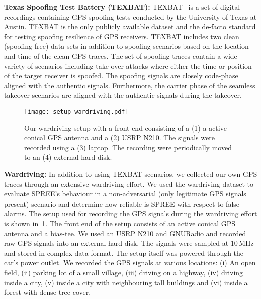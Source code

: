 \documentclass[letterpaper,twocolumn,10pt]{article}
\newcommand{\unit}[1]{\ensuremath{\, \mathrm{#1}}}
\newcommand{\rxname}{SPREE\xspace}
\begin{document}
\noindent\textbf{Texas Spoofing Test Battery (TEXBAT):} TEXBAT~\cite{humphreys2012texas} is a set of digital recordings containing GPS spoofing tests conducted by the University of Texas at Austin. TEXBAT is the only publicly available dataset and the de-facto standard for testing spoofing resilience of GPS receivers. TEXBAT includes two clean (spoofing free) data sets in addition to spoofing scenarios based on the location and time of the clean GPS traces. The set of spoofing traces contain a wide variety of scenarios including take-over attacks where either the time or position of the target receiver is spoofed. The spoofing signals are closely code-phase aligned with the authentic signals. Furthermore, the carrier phase of the seamless takeover scenarios are aligned with the authentic signals during the takeover.\\


\begin{figure}[t]
  \centering
  \texttt{[image: setup\_wardriving.pdf]}
  \caption{Our wardriving setup with a front-end consisting of a (1) a active conical GPS antenna and a (2) USRP N210. The signals were recorded using a (3) laptop. The recording were periodically moved to an (4) external hard disk.}
  \label{fig:wardriving}
\end{figure}


\noindent\textbf{Wardriving:} In addition to using TEXBAT scenarios, we collected our own  GPS traces through an extensive wardriving effort. We used the wardriving dataset to evaluate \rxname's behaviour in a non-adversarial (only legitimate GPS signals present) scenario and determine how reliable is \rxname with respect to false alarms. The setup used for recording the GPS signals during the wardriving effort is shown in~\ref{fig:wardriving}. The front end of the setup consists of an active conical GPS antenna and a bias-tee. We used an USRP N210 and GNURadio and recorded raw GPS signals into an external hard disk. The signals were sampled at $10\unit{MHz}$ and stored in complex data format. The setup itself was powered through the car's power outlet. We recorded the GPS signals at various locations: (i) An open field, (ii) parking lot of a small village, (iii) driving on a highway, (iv) driving inside a city, (v) inside a city with neighbouring tall buildings and (vi) inside a forest with dense tree cover. 
\end{document}
